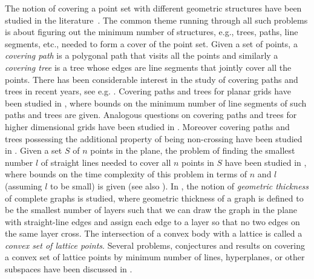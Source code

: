 \documentclass[
final
]{dmtcs-episciences}
\numberwithin{equation}{subsection}
\begin{document}
\medskip
The notion of covering a point set with different geometric structures have been studied in the literature~\cite{brass, keszegh2013covering, dillencourt2004geometric, dumitrescu2014covering, grantson2006covering}. The common theme running through all such problems is about figuring out the minimum number of structures, e.g., trees, paths, line segments, etc., needed to form a cover of the point set.  
Given a set of points, a {\it covering path} is a polygonal path that visits all the points and similarly a {\it covering tree} is a tree whose edges are line segments that jointly cover all the points. There has been considerable interest in the study of covering paths and trees in recent years, see e.g. \cite{arkin2003, dumitrescu2014}. Covering paths and trees for planar grids have been studied in \cite{keszegh2013covering}, where bounds on the minimum number of line segments of such paths and trees are given. Analogous questions on covering paths and trees for higher dimensional grids have been studied in \cite{dumitrescu2014covering}. Moreover covering paths and trees possessing the additional property of being non-crossing have been studied in \cite{biniaz2024, cerny2007}. Given a set $S$ of $n$ points in the plane, the problem of finding the smallest number $l$ of straight lines needed to cover all $n$ points in $S$ have been studied in \cite{grantson2006covering}, where bounds on the time complexity of this problem in terms of $n$ and $l$ (assuming $l$ to be small) is given (see also \cite{chen2021}). In \cite{dillencourt2004geometric}, the notion of {\it geometric thickness} of complete graphs is studied, where geometric thickness of a graph is defined to be the smallest number of layers such that we can draw the graph in the plane with straight-line edges and assign each edge to a layer so that no two edges on the same layer cross. The intersection of a convex body with a lattice is called a {\it convex set of lattice points}. Several problems, conjectures and results on covering a convex set of lattice points by minimum number of lines, hyperplanes, or other subspaces have been discussed in \cite{brass}.


\medskip
\end{document}
